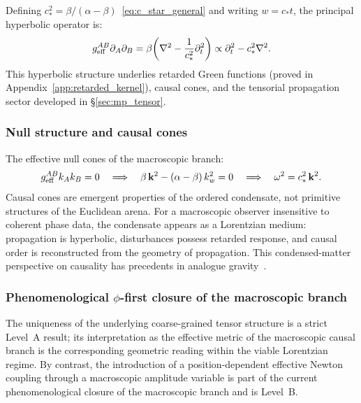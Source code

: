 \documentclass[11pt,a4paper]{article}
\numberwithin{equation}{section}
\begin{document}
Defining $c_*^2=\beta/(\alpha-\beta)$~\eqref{eq:c_star_general} and
writing $w=c_*t$, the principal hyperbolic operator is:
\begin{equation}
  \label{eq:principal_op}
  g_{\rm eff}^{AB}\partial_A\partial_B
  = \beta\!\left(\nabla^2-\frac{1}{c_*^2}\partial_t^2\right)
  \propto \partial_t^2-c_*^2\nabla^2.
\end{equation}
This hyperbolic structure underlies retarded Green functions
(proved in Appendix~\ref{app:retarded_kernel}), causal cones, and
the tensorial propagation sector developed in \S\ref{sec:mp_tensor}.

\subsubsection*{Null structure and causal cones}

The effective null cones of the macroscopic branch:
\begin{equation}
  \label{eq:null_condition}
  g_{\rm eff}^{AB}k_Ak_B=0
  \quad\Longrightarrow\quad
  \beta\,\mathbf{k}^2-(\alpha-\beta)\,k_w^2=0
  \quad\Longrightarrow\quad
  \omega^2=c_*^2\,\mathbf{k}^2.
\end{equation}
Causal cones are emergent properties of the ordered condensate, not
primitive structures of the Euclidean arena.
For a macroscopic observer insensitive to coherent phase data,
the condensate appears as a Lorentzian medium: propagation is
hyperbolic, disturbances possess retarded response, and causal order
is reconstructed from the geometry of propagation.
This condensed-matter perspective on causality has precedents in
analogue gravity~\cite{Unruh1981,Volovik2003}.

\subsubsection*{Phenomenological $\phi$-first closure of the macroscopic branch}

The uniqueness of the underlying coarse-grained tensor structure is a
strict Level~A result; its interpretation as the effective metric of the
macroscopic causal branch is the corresponding geometric reading within
the viable Lorentzian regime.
By contrast, the introduction of a position-dependent effective Newton
coupling through a macroscopic amplitude variable is part of the current
phenomenological closure of the macroscopic branch and is Level~B.
\end{document}
